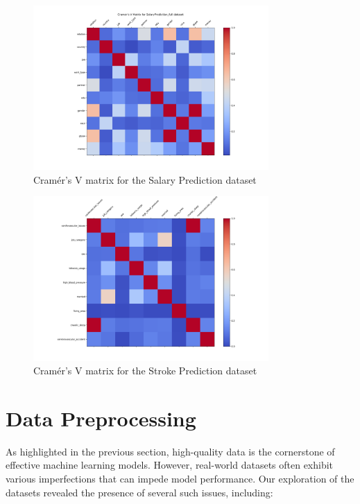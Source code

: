 \documentclass[runningheads]{paper}
\begin{document}
\begin{figure}[H]
    \centering
    \includegraphics[width=0.8\textwidth]{../plots/cramer_v_matrix_SalaryPrediction_full.png}
    \caption{Cramér's V matrix for the Salary Prediction dataset}
    \label{fig:cramer_v_matrix_example_salary}
\end{figure}

\begin{figure}[H]
    \centering
    \includegraphics[width=0.8\textwidth]{../plots/cramer_v_matrix_AVC_full.png}
    \caption{Cramér's V matrix for the Stroke Prediction dataset}
    \label{fig:cramer_v_matrix_example_stroke}
\end{figure}

\section{Data Preprocessing}
As highlighted in the previous section, high-quality data is the cornerstone of 
effective machine learning models. However, real-world datasets often exhibit 
various imperfections that can impede model performance.  Our exploration of the 
datasets revealed the presence of several such issues, including:
\end{document}
